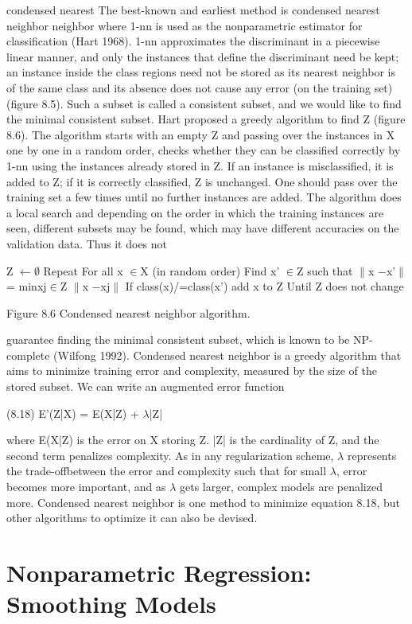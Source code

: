 condensed nearest The best-known and earliest method is condensed nearest neighbor neighbor where 1-nn is used as the nonparametric estimator for classification (Hart 1968). 1-nn approximates the discriminant in a piecewise linear manner, and only the instances that define the discriminant need be kept; an instance inside the class regions need not be stored as its nearest neighbor is of the same class and its absence does not cause any error (on the training set) (figure 8.5). Such a subset is called a consistent subset, and we would like to find the minimal consistent subset. Hart proposed a greedy algorithm to find Z (figure 8.6). The algorithm starts with an empty Z and passing over the instances in X one by one in a random order, checks whether they can be classified correctly by 1-nn using the instances already stored in Z. If an instance is misclassified, it is added to Z; if it is correctly classified, Z is unchanged. One should pass over the training set a few times until no further instances are added. The algorithm does a local search and depending on the order in which the training instances are seen, different subsets may be found, which may have different accuracies on the validation data. Thus it does not

Z $\leftarrow$$\emptyset$ Repeat For all x $\in$X (in random order) Find x' $\in$Z such that $\parallel$x $-$x'$\parallel$= minxj$\in$Z $\parallel$x $-$xj$\parallel$ If class(x)/=class(x') add x to Z Until Z does not change

Figure 8.6 Condensed nearest neighbor algorithm.

guarantee finding the minimal consistent subset, which is known to be NP-complete (Wilfong 1992). Condensed nearest neighbor is a greedy algorithm that aims to minimize training error and complexity, measured by the size of the stored subset. We can write an augmented error function

(8.18) E'(Z|X) = E(X|Z) + $\lambda$|Z|

where E(X|Z) is the error on X storing Z. |Z| is the cardinality of Z, and the second term penalizes complexity. As in any regularization scheme, $\lambda$ represents the trade-offbetween the error and complexity such that for small $\lambda$, error becomes more important, and as $\lambda$ gets larger, complex models are penalized more. Condensed nearest neighbor is one method to minimize equation 8.18, but other algorithms to optimize it can also be devised.

\section{Nonparametric Regression: Smoothing Models}


